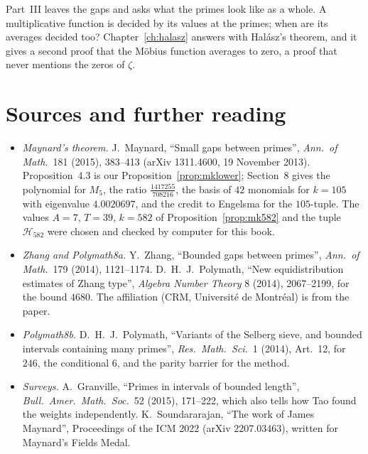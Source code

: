 Part~III leaves the gaps and asks what the primes look like as a whole. A multiplicative function is decided by its values at the primes; when are its averages decided too? Chapter~\ref{ch:halasz} answers with Halász's theorem, and it gives a second proof that the Möbius function averages to zero, a proof that never mentions the zeros of $\zeta$.

\section*{Sources and further reading}

\begin{itemize}
\item \emph{Maynard's theorem.} J.~Maynard, ``Small gaps between primes'', \emph{Ann.\ of Math.}\ 181 (2015), 383--413 (arXiv 1311.4600, 19 November 2013). Proposition~4.3 is our Proposition~\ref{prop:mklower}; Section~8 gives the polynomial for $M_5$, the ratio $\frac{1417255}{708216}$, the basis of $42$ monomials for $k=105$ with eigenvalue $4.0020697$, and the credit to Engelsma for the $105$-tuple. The values $A=7$, $T=39$, $k=582$ of Proposition~\ref{prop:mk582} and the tuple $\mathcal H_{582}$ were chosen and checked by computer for this book.
\item \emph{Zhang and Polymath8a.} Y.~Zhang, ``Bounded gaps between primes'', \emph{Ann.\ of Math.}\ 179 (2014), 1121--1174. D.~H.~J.~Polymath, ``New equidistribution estimates of Zhang type'', \emph{Algebra Number Theory} 8 (2014), 2067--2199, for the bound $4680$. The affiliation (CRM, Université de Montréal) is from the paper.
\item \emph{Polymath8b.} D.~H.~J.~Polymath, ``Variants of the Selberg sieve, and bounded intervals containing many primes'', \emph{Res.\ Math.\ Sci.}\ 1 (2014), Art.~12, for $246$, the conditional $6$, and the parity barrier for the method.
\item \emph{Surveys.} A.~Granville, ``Primes in intervals of bounded length'', \emph{Bull.\ Amer.\ Math.\ Soc.}\ 52 (2015), 171--222, which also tells how Tao found the weights independently. K.~Soundararajan, ``The work of James Maynard'', Proceedings of the ICM 2022 (arXiv 2207.03463), written for Maynard's Fields Medal.
\end{itemize}
